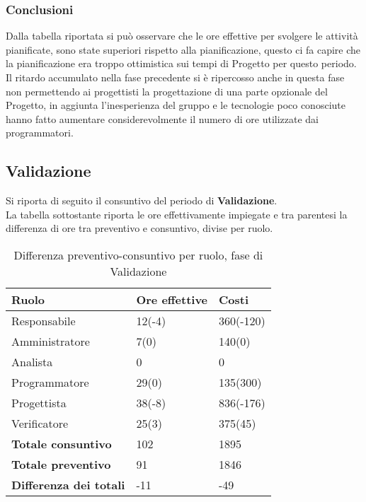 \subsubsection{Conclusioni}

Dalla tabella riportata si può osservare che le ore effettive per svolgere le attività pianificate, sono state superiori rispetto alla pianificazione, questo ci fa capire che la pianificazione era troppo ottimistica sui tempi di Progetto per questo periodo.
Il ritardo accumulato nella fase precedente si è ripercosso anche in questa fase non permettendo ai progettisti la progettazione di una parte opzionale del Progetto, in aggiunta l'inesperienza del gruppo e le tecnologie poco conosciute hanno fatto aumentare considerevolmente il numero di ore utilizzate dai programmatori.



\subsection{Validazione}

Si riporta di seguito il consuntivo del periodo di \textbf{Validazione}.\\
La tabella sottostante riporta le ore effettivamente impiegate e tra parentesi la differenza di ore tra preventivo e consuntivo, divise per ruolo.\\ 
	\begin{table}[H]
		\centering
	  \begin{tabular}{p{}p{}
		    							p{}}
		   \toprule Ruolo & Ore effettive & Costi \\
		   \midrule
		   Responsabile & 12(-4) & 360(-120) \\
		   Amministratore & 7(0) & 140(0) \\
		   Analista & 0 & 0 \\
		   Programmatore & 29(0) & 135(300) \\
		   Progettista & 38(-8) & 836(-176) \\
		   Verificatore & 25(3) & 375(45) \\
		   \hline
		   \textbf{Totale consuntivo} & 102 & 1895 \\
		   \textbf{Totale preventivo} & 91 & 1846 \\
		   \textbf{Differenza dei totali} & -11 & -49 \\
		   \bottomrule
	 \end{tabular}
	 	\label{tab:costuntivoValidazione}
	 	\caption{Differenza preventivo-consuntivo per ruolo, fase di Validazione}
	\end{table}

